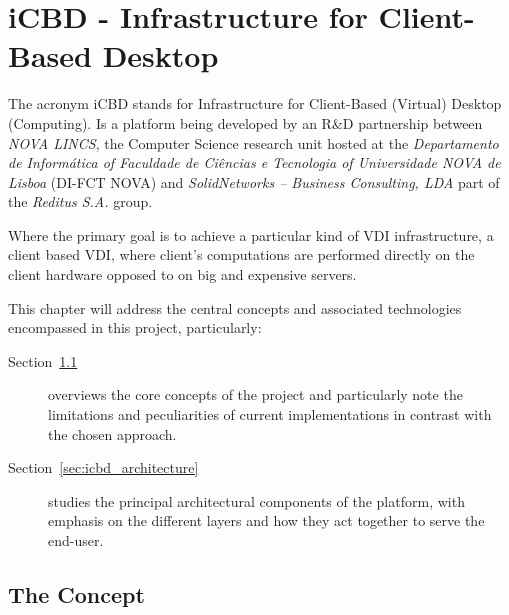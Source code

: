 

\chapter{iCBD - Infrastructure for Client-Based Desktop}
\label{cha:icbd}

The acronym \gls{iCBD} stands for Infrastructure for Client-Based (Virtual) Desktop (Computing). Is a platform being developed by an R\&D partnership between \textit{NOVA LINCS}, the Computer Science research unit hosted at the \textit{Departamento de Informática of Faculdade de Ciências e Tecnologia of Universidade NOVA de Lisboa} (DI-FCT NOVA) and \textit{SolidNetworks – Business Consulting, LDA} part of the \textit{Reditus S.A.} group. 

Where the primary goal is to achieve a particular kind of \gls{VDI} infrastructure, a client based VDI, where client's computations are performed directly on the client hardware opposed to on big and expensive servers.

This chapter will address the central concepts and associated technologies encompassed in this project, particularly:\\

\begin{description}
	\item [Section~\ref{sec:icbd_concept}] overviews the core concepts of the project and particularly note the limitations and peculiarities of current implementations in contrast with the chosen approach.
	\item [Section~\ref{sec:icbd_architecture}] studies the principal architectural components of the platform, with emphasis on the different layers and how  they act together to serve the end-user.
\end{description}


\section{The Concept} %
\label{sec:icbd_concept}

